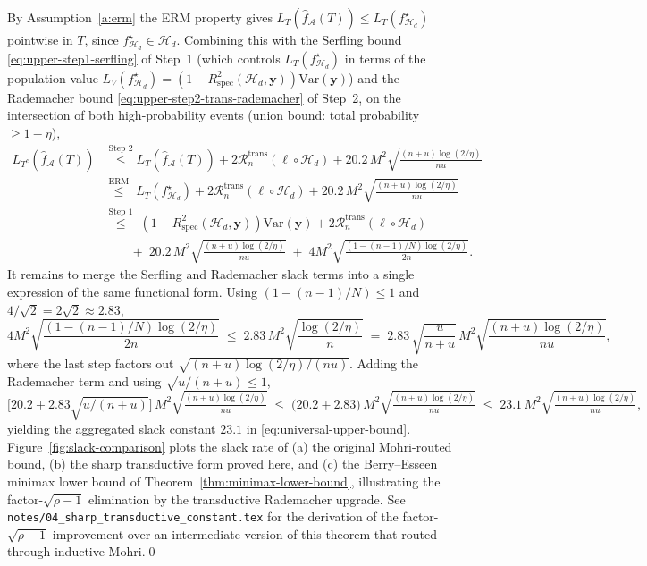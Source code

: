 \documentclass[11pt,a4paper]{article}
\theoremstyle{plain}
\theoremstyle{definition}
\theoremstyle{remark}
\newcommand{\by}{\mathbf{y}}
\newcommand{\Var}{\mathrm{Var}}
\newcommand{\Rspec}{R^2_{\mathrm{spec}}}
\newcommand{\Acal}{\mathcal{A}}
\newcommand{\Hcal}{\mathcal{H}}
\begin{document}
By Assumption~\ref{a:erm} the ERM property gives
$L_T(\hat f_\Acal(T)) \leq L_T(f^\star_{\Hcal_d})$ pointwise in $T$,
since $f^\star_{\Hcal_d} \in \Hcal_d$. Combining this with the
Serfling bound \eqref{eq:upper-step1-serfling} of Step~1 (which
controls $L_T(f^\star_{\Hcal_d})$ in terms of the population value
$L_V(f^\star_{\Hcal_d}) = (1-\Rspec(\Hcal_d,\by))\Var(\by)$) and
the Rademacher bound \eqref{eq:upper-step2-trans-rademacher} of
Step~2, on the intersection of both high-probability events
(union bound: total probability $\ge 1 - \eta$),
\begin{align*}
    L_{T^c}(\hat f_\Acal(T))
    &\stackrel{\text{Step 2}}{\leq}
        L_T(\hat f_\Acal(T)) + 2\mathcal{R}^{\mathrm{trans}}_n(\ell\circ\Hcal_d)
        + 20.2\, M^2 \sqrt{\tfrac{(n+u)\log(2/\eta)}{nu}}\\
    &\stackrel{\text{ERM}}{\leq}\;
        L_T(f^\star_{\Hcal_d}) + 2\mathcal{R}^{\mathrm{trans}}_n(\ell\circ\Hcal_d)
        + 20.2\, M^2 \sqrt{\tfrac{(n+u)\log(2/\eta)}{nu}}\\
    &\stackrel{\text{Step 1}}{\leq}\;
        (1 - \Rspec(\Hcal_d, \by))\Var(\by)
        + 2\mathcal{R}^{\mathrm{trans}}_n(\ell\circ\Hcal_d)\\
    &\qquad+\; 20.2\, M^2 \sqrt{\tfrac{(n+u)\log(2/\eta)}{nu}}
        \;+\; 4 M^2 \sqrt{\tfrac{(1 - (n-1)/N)\log(2/\eta)}{2n}}.
\end{align*}
It remains to merge the Serfling and Rademacher slack terms into a
single expression of the same functional form. Using
$(1-(n-1)/N) \le 1$ and $4/\sqrt{2} = 2\sqrt{2} \approx 2.83$,
\[
    4 M^2 \sqrt{\frac{(1-(n-1)/N)\log(2/\eta)}{2n}}
    \;\le\; 2.83\, M^2 \sqrt{\frac{\log(2/\eta)}{n}}
    \;=\; 2.83\,\sqrt{\frac{u}{n+u}}\, M^2 \sqrt{\frac{(n+u)\log(2/\eta)}{nu}},
\]
where the last step factors out $\sqrt{(n+u)\log(2/\eta)/(nu)}$.
Adding the Rademacher term and using $\sqrt{u/(n+u)} \le 1$,
\[
    \Big[20.2 + 2.83\sqrt{u/(n+u)}\Big]\, M^2 \sqrt{\tfrac{(n+u)\log(2/\eta)}{nu}}
    \;\le\;\big(20.2 + 2.83\big)\, M^2 \sqrt{\tfrac{(n+u)\log(2/\eta)}{nu}}
    \;\le\; 23.1\, M^2 \sqrt{\tfrac{(n+u)\log(2/\eta)}{nu}},
\]
yielding the aggregated slack constant $23.1$ in
\eqref{eq:universal-upper-bound}.  Figure~\ref{fig:slack-comparison}
plots the slack rate of (a) the original Mohri-routed bound, (b) the
sharp transductive form proved here, and (c) the Berry--Esseen minimax
lower bound of Theorem~\ref{thm:minimax-lower-bound}, illustrating the
factor-$\sqrt{\rho-1}$ elimination by the transductive Rademacher
upgrade.  See
\texttt{notes/04\_sharp\_transductive\_constant.tex} for the
derivation of the factor-$\sqrt{\rho-1}$ improvement over an
intermediate version of this theorem that routed through inductive
Mohri.\qed
\end{document}

